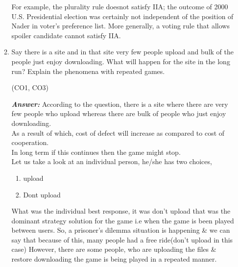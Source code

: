 \documentclass[15pt]{article}
\begin{document}
\begin{enumerate}
\begin{enumerate}
For example, the plurality rule doesnot satisfy IIA; the outcome of 2000 U.S. Presidential election was certainly not independent of the position of Nader in voter's preference list. More generally, a voting rule that allows spoiler candidate cannot satisfy IIA.\\

\item Say there is a site and in that site very few people upload and
bulk of the people just enjoy downloading. What will happen for
the site in the long run? Explain the phenomena with repeated
games.
\begin{flushright}
[5] (CO1, CO3)
\end{flushright}
\textbf{\emph{Answer: }}According to the question, there is a site where there are very few people who upload whereas there are bulk of people who just enjoy downloading.\\

As a result of which, cost of defect will increase as compared to cost of cooperation.\\
In long term if this continues then the game might stop.\\
Let us take a look at an individual person, he/she has two choices,
\begin{enumerate}
\item upload
\item Dont upload
\end{enumerate}

What was the individual best response, it was don't upload that was the dominant strategy solution for the game i.e when the game is been played between users.
So, a prisoner's dilemma situation is happening \& we can say that because of this, many people had a free ride(don't upload in this case)
However, there are some people, who are uploading the files \& restore downloading the game is being played in a repeated manner.


\end{enumerate}
\end{enumerate}
\end{document}
